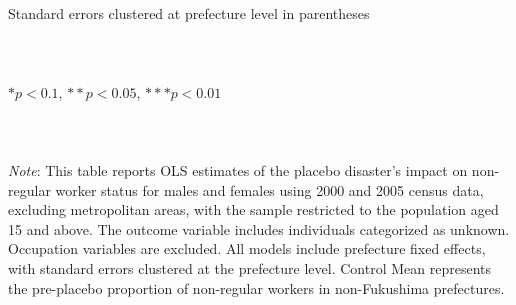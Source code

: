 \documentclass[serif, aspectratio=169]{beamer}
\begin{document}
\begin{frame}[label=nonregular_placebo]
\begin{table}[htbp]
\begin{tabular}{@{}l*{6}{c}@{}}
\bottomrule
\end{tabular}
\\\\{\linewidth}{\tiny Standard errors clustered at prefecture level in parentheses}\\\\
\\\\{\linewidth}{\tiny $*p<0.1$, $**p<0.05$, $***p<0.01$}\\\\
\\\\{\linewidth}{\tiny \textit{Note}: This table reports OLS estimates of the placebo disaster's impact on non-regular worker status for males and females using 2000 and 2005 census data, excluding metropolitan areas, with the sample restricted to the population aged 15 and above. The outcome variable includes individuals categorized as unknown. Occupation variables are excluded. All models include prefecture fixed effects, with standard errors clustered at the prefecture level. Control Mean represents the pre-placebo proportion of non-regular workers in non-Fukushima prefectures.}
\end{table}


\end{frame}
\end{document}
